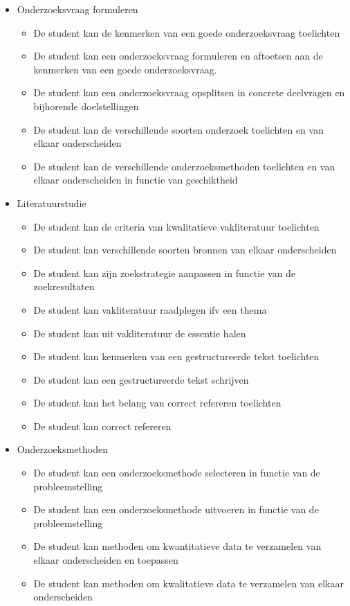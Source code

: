 \begin{itemize}
  \item Onderzoeksvraag formuleren
        \begin{itemize}
          \item De student kan de kenmerken van een goede onderzoeksvraag toelichten
          \item De student kan een onderzoeksvraag formuleren en aftoetsen aan de kenmerken van een goede onderzoeksvraag.
          \item De student kan een onderzoeksvraag opsplitsen in concrete deelvragen en bijhorende doelstellingen
          \item De student kan de verschillende soorten onderzoek toelichten en van elkaar onderscheiden
          \item De student kan de verschillende onderzoeksmethoden toelichten en van elkaar onderscheiden in functie van geschiktheid
        \end{itemize}

  \item Literatuurstudie
        \begin{itemize}
          \item De student kan de criteria van kwalitatieve vakliteratuur toelichten
          \item De student kan verschillende soorten bronnen van elkaar onderscheiden
          \item De student kan zijn zoekstrategie aanpassen in functie van de zoekresultaten
          \item De student kan vakliteratuur raadplegen ifv een thema
          \item De student kan uit vakliteratuur de essentie halen
          \item De student kan kenmerken van een gestructureerde tekst toelichten
          \item De student kan een gestructureerde tekst schrijven
          \item De student kan het belang van correct refereren toelichten
          \item De student kan correct refereren
        \end{itemize}

  \item Onderzoeksmethoden
        \begin{itemize}
          \item De student kan een onderzoeksmethode selecteren in functie van de probleemstelling
          \item De student kan een onderzoeksmethode uitvoeren in functie van de probleemstelling
          \item De student kan methoden om kwantitatieve data te verzamelen van elkaar onderscheiden en toepassen
          \item De student kan methoden om kwalitatieve data te verzamelen van elkaar onderscheiden
        \end{itemize}


\end{itemize}
